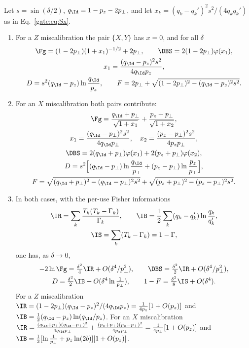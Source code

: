 \begin{proposition}\label{gate:prop:Bqubit}
Let $s=\sin(\delta/2)$, $q_\Id=1-p_z-2p_\perp$, and let $x_k=(q_k-q_k')^2s^2/(4q_kq_k')$ as in Eq.~\eqref{gate:eq:Sx}.
\begin{enumerate}
\item[(a)] For a $Z$ miscalibration the pair $\{X,Y\}$ has $x=0$, and for all $\delta$
\begin{gather}
\Fg=(1-2p_\perp)(1+x_1)^{-1/2}+2p_\perp,\qquad \DBS=2(1-2p_\perp)\varphi(x_1),\notag\\
x_1=\frac{(q_\Id-p_z)^2s^2}{4q_\Id p_z},\\
D=s^2(q_\Id-p_z)\ln\frac{q_\Id}{p_z},\qquad F=2p_\perp+\sqrt{(1-2p_\perp)^2-(q_\Id-p_z)^2s^2}.
\end{gather}
\item[(b)] For an $X$ miscalibration both pairs contribute:
\begin{gather}
\Fg=\frac{q_\Id+p_\perp}{\sqrt{1+x_1}}+\frac{p_z+p_\perp}{\sqrt{1+x_2}},\notag\\
x_1=\frac{(q_\Id-p_\perp)^2s^2}{4q_\Id p_\perp},\quad x_2=\frac{(p_z-p_\perp)^2s^2}{4p_zp_\perp},\\
\DBS=2(q_\Id+p_\perp)\varphi(x_1)+2(p_z+p_\perp)\varphi(x_2),\notag\\
D=s^2\Big[(q_\Id-p_\perp)\ln\frac{q_\Id}{p_\perp}+(p_z-p_\perp)\ln\frac{p_z}{p_\perp}\Big],\\
F=\sqrt{(q_\Id+p_\perp)^2-(q_\Id-p_\perp)^2s^2}+\sqrt{(p_z+p_\perp)^2-(p_z-p_\perp)^2s^2}.
\end{gather}
\item[(c)] In both cases, with the per-use Fisher informations
\begin{equation}\label{gate:eq:Bfisher}
\begin{gathered}
\IR=\sum_k\frac{T_k(T_k-\Gamma_k)}{\Gamma_k},\qquad \IB=\frac12\sum_k(q_k-q_k')\ln\frac{q_k}{q_k'},\\
\IS=\sum_k(T_k-\Gamma_k)=1-\Gamma ,
\end{gathered}
\end{equation}
one has, as $\delta\to0$,
\begin{gather}
-2\ln\Fg=\tfrac{\delta^2}{4}\IR+O(\delta^4/p_\perp^2),\qquad \DBS=\tfrac{\delta^2}{2}\IR+O(\delta^4/p_\perp^2),\\
D=\tfrac{\delta^2}{2}\IB+O(\delta^4\ln\tfrac1{p_\perp}),\qquad 1-F=\tfrac{\delta^2}{8}\IS+O(\delta^4).
\end{gather}
For a $Z$ miscalibration $\IR=(1-2p_\perp)(q_\Id-p_z)^2/(4q_\Id p_z)=\frac1{4p_z}[1+O(p_z)]$ and $\IB=\frac12(q_\Id-p_z)\ln(q_\Id/p_z)$. For an $X$ miscalibration $\IR=\frac{(q_\Id+p_\perp)(q_\Id-p_\perp)^2}{4q_\Id p_\perp}+\frac{(p_z+p_\perp)(p_z-p_\perp)^2}{4p_zp_\perp}=\frac{1}{4p_\perp}[1+O(p_z)]$ and $\IB=\frac12[\ln\frac1{p_\perp}+p_z\ln(2b)][1+O(p_z)]$.
\end{enumerate}
\end{proposition}

